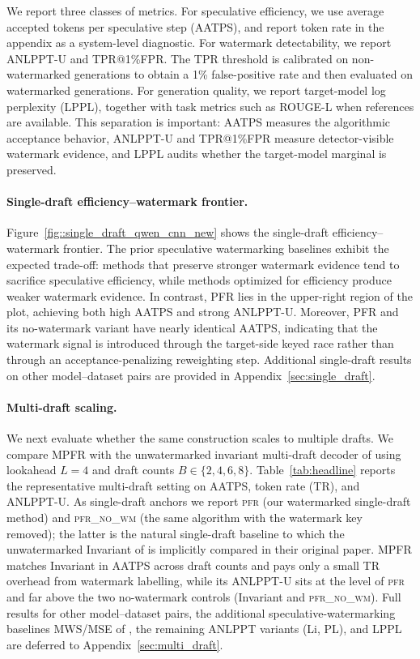 We report three classes of metrics. For speculative efficiency, we use average
accepted tokens per speculative step (AATPS), and report token rate in the appendix
as a system-level diagnostic. For watermark detectability, we report ANLPPT-U and
TPR@1\%FPR. The TPR threshold is calibrated on non-watermarked generations to obtain
a 1\% false-positive rate and then evaluated on watermarked generations. For
generation quality, we report target-model log perplexity (LPPL), together with
task metrics such as ROUGE-L when references are available. This separation is
important: AATPS measures the algorithmic acceptance behavior, ANLPPT-U and
TPR@1\%FPR measure detector-visible watermark evidence, and LPPL audits whether the
target-model marginal is preserved.

\paragraph{Single-draft efficiency--watermark frontier.}
Figure~\ref{fig::single_draft_qwen_cnn_new} shows the single-draft
efficiency--watermark frontier. The prior speculative watermarking baselines exhibit
the expected trade-off: methods that preserve stronger watermark evidence tend to
sacrifice speculative efficiency, while methods optimized for efficiency produce
weaker watermark evidence. In contrast, \textsc{PFR} lies in the upper-right region
of the plot, achieving both high AATPS and strong ANLPPT-U. Moreover,
\textsc{PFR} and its no-watermark variant have nearly identical AATPS, indicating
that the watermark signal is introduced through the target-side keyed race rather
than through an acceptance-penalizing reweighting step. Additional single-draft
results on other model--dataset pairs are provided in Appendix~\ref{sec:single_draft}.

\paragraph{Multi-draft scaling.}
We next evaluate whether the same construction scales to multiple drafts. We compare
\textsc{MPFR} with the unwatermarked invariant multi-draft decoder of
\citet{rowan2025list} using lookahead $L=4$ and draft counts $B\in\{2,4,6,8\}$.
Table~\ref{tab:headline} reports the representative multi-draft setting on
AATPS, token rate (TR), and ANLPPT-U.  As single-draft anchors we report
\textsc{pfr} (our watermarked single-draft method) and \textsc{pfr\_no\_wm}
(the same algorithm with the watermark key removed); the latter is the natural
single-draft baseline to which the unwatermarked Invariant of \citet{rowan2025list}
is implicitly compared in their original paper.  \textsc{MPFR} matches Invariant
in AATPS across draft counts and pays only a small TR overhead from watermark
labelling, while its ANLPPT-U sits at the level of \textsc{pfr} and far above the
two no-watermark controls (Invariant and \textsc{pfr\_no\_wm}).  Full results for
other model--dataset pairs, the additional speculative-watermarking baselines
\textsc{MWS}/\textsc{MSE} of \citet{hu2024inevitable}, the remaining ANLPPT
variants (Li, PL), and LPPL are deferred to Appendix~\ref{sec:multi_draft}.

